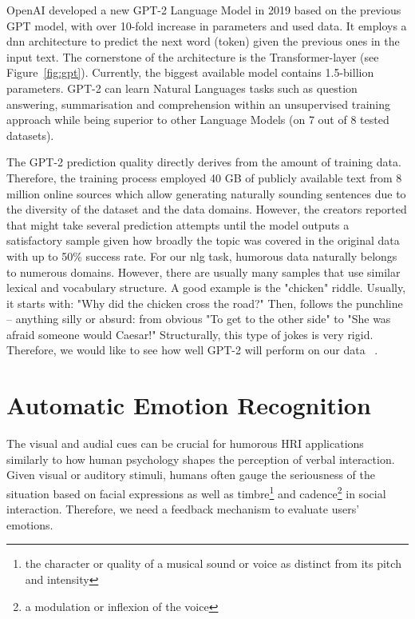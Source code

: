 OpenAI developed a new GPT-2 Language Model in 2019 based on the previous GPT model, with over 10-fold increase in parameters and used data. It employs a \acrlong{dnn} architecture to predict the next word (token) given the previous ones in the input text. The cornerstone of the architecture is the Transformer-layer (see Figure~\ref{fig:gpt}). Currently, the biggest available model contains 1.5-billion parameters. GPT-2 can learn Natural Languages tasks such as question answering, summarisation and comprehension within an unsupervised training approach while being superior to other Language Models (on 7 out of 8 tested datasets).

The GPT-2 prediction quality directly derives from the amount of training data. Therefore, the training process employed 40 GB of publicly available text from 8 million online sources which allow generating naturally sounding sentences due to the diversity of the dataset and the data domains. However, the creators reported that might take several prediction attempts until the model outputs a satisfactory sample given how broadly the topic was covered in the original data with up to 50\% success rate. For our \acrshort{nlg} task, humorous data naturally belongs to numerous domains. However, there are usually many samples that use similar lexical and vocabulary structure. A good example is the "chicken" riddle. Usually, it starts with: "Why did the chicken cross the road?" Then, follows the punchline – anything silly or absurd: from obvious "To get to the other side" to "She was afraid someone would Caesar!" Structurally, this type of jokes is very rigid. Therefore, we would like to see how well GPT-2 will perform on our data ~\parencite{radford2019language}.

\section{Automatic Emotion Recognition}

The visual and audial cues can be crucial for humorous HRI applications similarly to how human psychology shapes the perception of verbal interaction. Given visual or auditory stimuli, humans often gauge the seriousness of the situation based on facial expressions as well as timbre\footnote{the character or quality of a musical sound or voice as distinct from its pitch and intensity} and cadence\footnote{a modulation or inflexion of the voice} in social interaction. Therefore, we need a feedback mechanism to evaluate users' emotions. 

